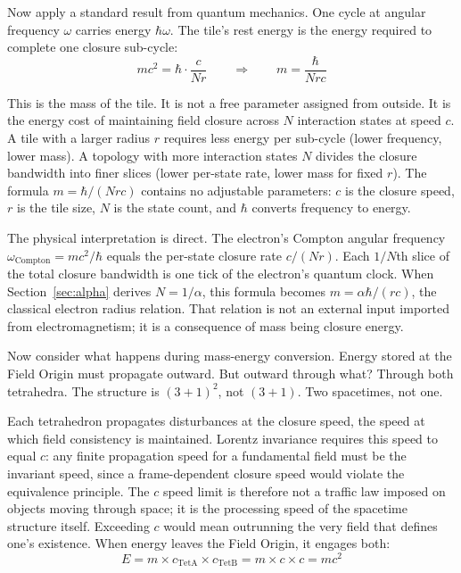 \documentclass[aps,prd,preprint,superscriptaddress,showpacs,preprintnumbers,amsmath,amssymb,nofootinbib]{revtex4-2}
\begin{document}
Now apply a standard result from quantum mechanics. One cycle at angular frequency $\omega$ carries energy $\hbar\omega$. The tile's rest energy is the energy required to complete one closure sub-cycle:
\begin{equation}
mc^2 = \hbar \cdot \frac{c}{Nr} \qquad \Longrightarrow \qquad m = \frac{\hbar}{Nrc}
\label{eq:mass-closure}
\end{equation}

This is the mass of the tile. It is not a free parameter assigned from outside. It is the energy cost of maintaining field closure across $N$ interaction states at speed $c$. A tile with a larger radius $r$ requires less energy per sub-cycle (lower frequency, lower mass). A topology with more interaction states $N$ divides the closure bandwidth into finer slices (lower per-state rate, lower mass for fixed $r$). The formula $m = \hbar/(Nrc)$ contains no adjustable parameters: $c$ is the closure speed, $r$ is the tile size, $N$ is the state count, and $\hbar$ converts frequency to energy.

The physical interpretation is direct. The electron's Compton angular frequency $\omega_{\text{Compton}} = mc^2/\hbar$ equals the per-state closure rate $c/(Nr)$. Each $1/N$th slice of the total closure bandwidth is one tick of the electron's quantum clock. When Section~\ref{sec:alpha} derives $N = 1/\alpha$, this formula becomes $m = \alpha\hbar/(rc)$, the classical electron radius relation. That relation is not an external input imported from electromagnetism; it is a consequence of mass being closure energy.

Now consider what happens during mass-energy conversion. Energy stored at the Field Origin must propagate outward. But outward through what? Through both tetrahedra. The structure is $(3+1)^2$, not $(3+1)$. Two spacetimes, not one.

Each tetrahedron propagates disturbances at the closure speed, the speed at which field consistency is maintained. Lorentz invariance requires this speed to equal $c$: any finite propagation speed for a fundamental field must be the invariant speed, since a frame-dependent closure speed would violate the equivalence principle. The $c$ speed limit is therefore not a traffic law imposed on objects moving through space; it is the processing speed of the spacetime structure itself. Exceeding $c$ would mean outrunning the very field that defines one's existence. When energy leaves the Field Origin, it engages both:
\begin{equation}
E = m \times c_{\text{TetA}} \times c_{\text{TetB}} = m \times c \times c = mc^2
\end{equation}
\end{document}

